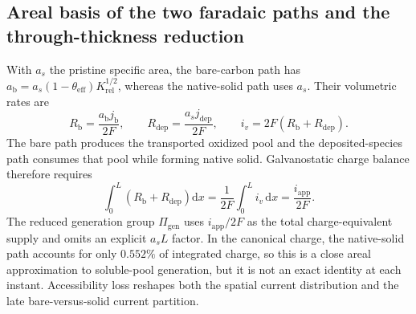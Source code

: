 \documentclass[11pt]{article}
\newcommand{\iapp}{i_{\mathrm{app}}}
\begin{document}
\subsection{Areal basis of the two faradaic paths and the through-thickness reduction}\label{sec:areabasis}
With $a_s$ the pristine specific area, the bare-carbon path has
$a_{\mathrm b}=a_s(1-\theta_{\mathrm{eff}})K_{\mathrm{rel}}^{1/2}$, whereas the native-solid path uses
$a_s$. Their volumetric rates are
\begin{equation}
R_{\mathrm b}=\frac{a_{\mathrm b}j_{\mathrm b}}{2F},\qquad
R_{\mathrm{dep}}=\frac{a_sj_{\mathrm{dep}}}{2F},\qquad
i_v=2F(R_{\mathrm b}+R_{\mathrm{dep}}).
\label{eq:rgen}
\end{equation}
The bare path produces the transported oxidized pool and the deposited-species path consumes that pool while
forming native solid. Galvanostatic charge balance therefore requires
\begin{equation}
\int_0^L\!\left(R_{\mathrm b}+R_{\mathrm{dep}}\right)\mathrm{d}x
=\frac{1}{2F}\int_0^L\!i_v\,\mathrm{d}x
=\frac{\iapp}{2F}.
\label{eq:Jgen}
\end{equation}
The reduced generation group $\Pi_{\mathrm{gen}}$ uses $\iapp/2F$ as the total charge-equivalent supply and
omits an explicit $a_sL$ factor. In the canonical charge, the native-solid path accounts for only $0.552\%$
of integrated charge, so this is a close areal approximation to soluble-pool generation, but it is not an exact
identity at each instant. Accessibility loss reshapes both the spatial current distribution and the late
bare-versus-solid current partition.
\end{document}
